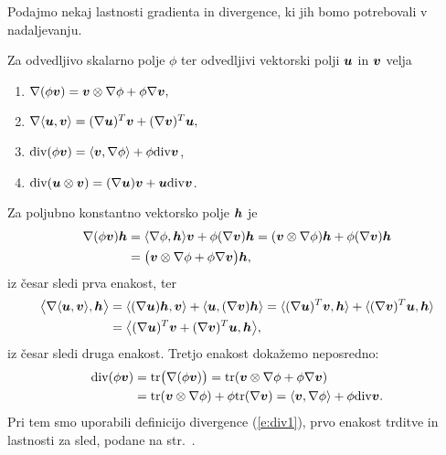 Podajmo nekaj lastnosti gradienta in divergence, ki jih bomo potrebovali v nadaljevanju.
\begin{trditev} \label{t:divprop}
	Za odvedljivo skalarno polje $\phi$ ter odvedljivi vektorski polji $\boldsymbol u$ in $\boldsymbol v$ velja
	\begin{enumerate}
		\item $\nabla(\phi\boldsymbol v)=\boldsymbol v\otimes\nabla\phi+\phi\nabla\boldsymbol v,$
		\item $\nabla\langle\boldsymbol u,\boldsymbol v\rangle=(\nabla\boldsymbol u)^T\boldsymbol v+(\nabla\boldsymbol v)^T\boldsymbol u,$
		\item $\mathrm{div}(\phi\boldsymbol v)=\langle\boldsymbol v,\nabla\phi\rangle+\phi\mathrm{div}\boldsymbol v$,
		\item $\mathrm{div}(\boldsymbol u\otimes\boldsymbol v)=(\nabla\boldsymbol u)\boldsymbol v+\boldsymbol u\mathrm{div}\boldsymbol v$.
	\end{enumerate}
\end{trditev}
\proof
	Za poljubno konstantno vektorsko polje $\boldsymbol h$ je
	\begin{align*}
		\nabla(\phi\boldsymbol v)\boldsymbol h&=
		\langle\nabla\phi,\boldsymbol h\rangle\boldsymbol v+\phi(\nabla\boldsymbol v)\boldsymbol h=
		(\boldsymbol v\otimes\nabla\phi)\boldsymbol h+\phi(\nabla\boldsymbol v)\boldsymbol h\\
		&=\big(\boldsymbol v\otimes\nabla\phi+\phi\nabla\boldsymbol v\big)\boldsymbol h,
	\end{align*}
	iz česar sledi prva enakost, ter
	\begin{align*}
		\big<\nabla\langle\boldsymbol u,\boldsymbol v\rangle,\boldsymbol h\big>&=\langle(\nabla\boldsymbol u)\boldsymbol h,\boldsymbol v\rangle
		+\langle\boldsymbol u,(\nabla\boldsymbol v)\boldsymbol h\rangle=
		\langle(\nabla\boldsymbol u)^T\boldsymbol v,\boldsymbol h\rangle+\langle(\nabla\boldsymbol v)^T\boldsymbol u,\boldsymbol h\rangle\\
		&=\big<(\nabla\boldsymbol u)^T\boldsymbol v+(\nabla\boldsymbol v)^T\boldsymbol u,\boldsymbol h\big>,
	\end{align*}
	iz česar sledi druga enakost. Tretjo enakost dokažemo neposredno:
	\begin{align*}
		\mathrm{div}(\phi\boldsymbol v)&=\mathrm{tr}\big(\nabla(\phi\boldsymbol v)\big)=\mathrm{tr}(\boldsymbol v\otimes\nabla\phi+\phi\nabla\boldsymbol v)\\
		&=\mathrm{tr}(\boldsymbol v\otimes\nabla\phi)+\phi\mathrm{tr}(\nabla\boldsymbol v)=\langle\boldsymbol v,\nabla\phi\rangle+\phi\mathrm{div}\boldsymbol v.
	\end{align*}
	Pri tem smo uporabili definicijo divergence (\ref{e:div1}), prvo enakost trditve in lastnosti za sled,
	podane na str.~\pageref{traceprop}.
	
